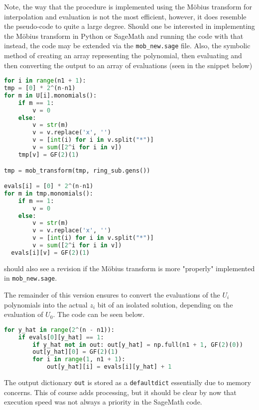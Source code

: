 Note, the way that the procedure is implemented using the Möbius transform for interpolation and evaluation is not the most efficient, however, it does resemble the pseudo-code to quite a large degree. Should one be interested in implementing the Möbius transform in Python or SageMath and running the code with that instead, the code may be extended via the \texttt{mob\_new.sage} file. Also, the symbolic method of creating an array representing the polynomial, then evaluating and then converting the output to an array of evaluations (seen in the snippet below)
\begin{lstlisting}[language=Python,style=mystyle]
for i in range(n1 + 1):
tmp = [0] * 2^(n-n1)
for m in U[i].monomials():
    if m == 1:
        v = 0
    else:
        v = str(m)
        v = v.replace('x', '')
        v = [int(i) for i in v.split("*")]
        v = sum([2^i for i in v])
    tmp[v] = GF(2)(1)

tmp = mob_transform(tmp, ring_sub.gens())

evals[i] = [0] * 2^(n-n1)
for m in tmp.monomials():
    if m == 1:
        v = 0
    else:
        v = str(m)
        v = v.replace('x', '')
        v = [int(i) for i in v.split("*")]
        v = sum([2^i for i in v])
  evals[i][v] = GF(2)(1)
\end{lstlisting}
should also see a revision if the Möbius transform is more "properly" implemented in \texttt{mob\_new.sage}.


The remainder of this version ensures to convert the evaluations of the $U_i$ polynomials into the actual $z_i$ bit of an isolated solution, depending on the evaluation of $U_0$. The code can be seen below.
\begin{lstlisting}[language=Python,style=mystyle]
 for y_hat in range(2^(n - n1)):
    if evals[0][y_hat] == 1:
        if y_hat not in out: out[y_hat] = np.full(n1 + 1, GF(2)(0))
        out[y_hat][0] = GF(2)(1)
        for i in range(1, n1 + 1):
            out[y_hat][i] = evals[i][y_hat] + 1
\end{lstlisting}
The output dictionary \texttt{out} is stored as a \texttt{defaultdict} essentially due to memory concerns. This of course adds processing, but it should be clear by now that execution speed was not always a priority in the SageMath code.

